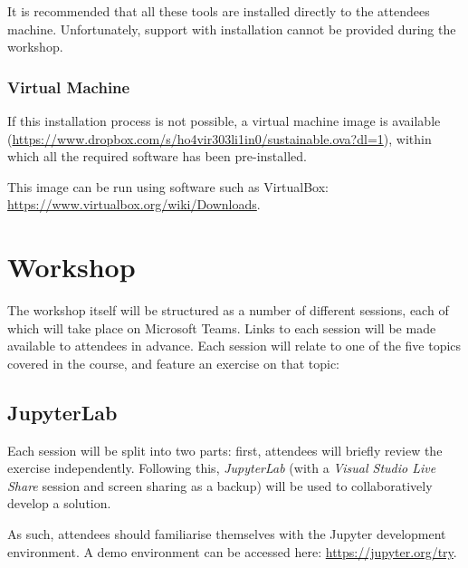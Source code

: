 \documentclass{article}
\begin{document}
It is recommended that all these tools are installed directly to the attendees machine. Unfortunately, support with installation cannot be provided during the workshop.

\subsubsection{Virtual Machine}

If this installation process is not possible, a virtual machine image is available (\href{https://www.dropbox.com/s/ho4vir303li1in0/sustainable.ova?dl=1}{https://www.dropbox.com/s/ho4vir303li1in0/sustainable.ova?dl=1}), within which all the required software has been pre-installed. 

This image can be run using software such as VirtualBox: \newline 
\href{https://www.virtualbox.org/wiki/Downloads}{https://www.virtualbox.org/wiki/Downloads}.

\section{Workshop}

The workshop itself will be structured as a number of different sessions, each of which will take place on Microsoft Teams.
Links to each session will be made available to attendees in advance.
Each session will relate to one of the five topics covered in the course, and feature an exercise on that topic:

\begin{table}[h!]

    \centering 
    
    
    
\end{table}

\subsection{JupyterLab}

Each session will be split into two parts: first, attendees will briefly review the exercise independently. 
Following this, \emph{JupyterLab} (with a \emph{Visual Studio Live Share} session and screen sharing as a backup) will be used to collaboratively develop a solution.

As such, attendees should familiarise themselves with the Jupyter development environment.
A demo environment can be accessed here: \href{https://jupyter.org/try}{https://jupyter.org/try}.
\end{document}

